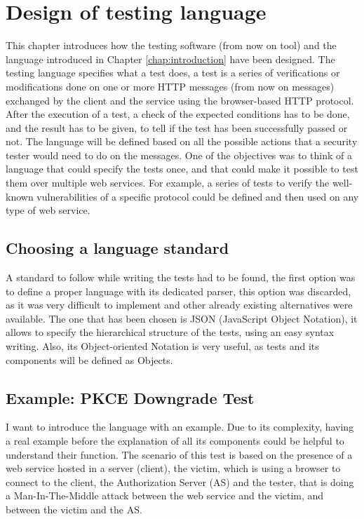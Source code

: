 \chapter{Design of testing language}
\label{chap:Design}
This chapter introduces how the testing software (from now on tool) and the language introduced in Chapter \ref{chap:introduction} have been designed. The testing language specifies what a test does, a test is a series of verifications or modifications done on one or more HTTP messages (from now on messages) exchanged by the client and the service using the browser-based HTTP protocol. After the execution of a test, a check of the expected conditions has to be done, and the result has to be given, to tell if the test has been successfully passed or not. The language will be defined based on all the possible actions that a security tester would need to do on the messages. 
One of the objectives was to think of a language that could specify the tests once, and that could make it possible to test them over multiple web services. For example, a series of tests to verify the well-known vulnerabilities of a specific protocol could be defined and then used on any type of web service.

\section{Choosing a language standard}
A standard to follow while writing the tests had to be found, the first option was to define a proper language with its dedicated parser, this option was discarded, as it was very difficult to implement and other already existing alternatives were available. The one that has been chosen is JSON (JavaScript Object Notation), it allows to specify the hierarchical structure of the tests, using an easy syntax writing. Also, its Object-oriented Notation is very useful, as tests and its components will be defined as Objects.

\section{Example: PKCE Downgrade Test}
\label{sec:pkce_downgrade}

I want to introduce the language with an example. Due to its complexity, having a real example before the explanation of all its components could be helpful to understand their function.
The scenario of this test is based on the presence of a web service hosted in a server (client), the victim, which is using a browser to connect to the client, the Authorization Server (AS) and the tester, that is doing a Man-In-The-Middle attack between the web service and the victim, and between the victim and the AS.

